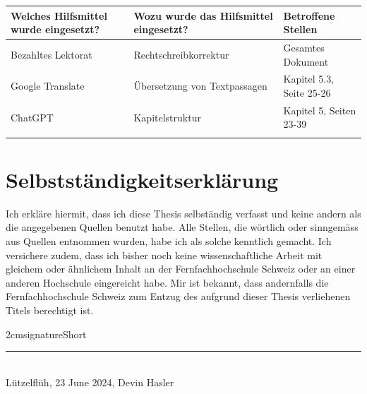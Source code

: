 \documentclass{ffhsthesis}
\begin{document}
    \begin{table}[h!]
        \centering
        \begin{tabular}{|p{5cm}|p{5cm}|p{4cm}|} \hline
        \textbf{Welches Hilfsmittel wurde eingesetzt?} & \textbf{Wozu wurde das Hilfsmittel eingesetzt?}  & \textbf{Betroffene Stellen}\\ \hline
        Bezahltes Lektorat & Rechtschreibkorrektur & Gesamtes Dokument \\ \hline
        Google Translate & Übersetzung von Textpassagen & Kapitel 5.3, Seite 25-26 \\ \hline
        ChatGPT & Kapitelstruktur & Kapitel 5, Seiten 23-39 \\ \hline
        &  & \\ \hline
        \end{tabular}
        \label{tab:hilfsmittelverzeichnis}
    \end{table}
    



    \chapter*{Selbstständigkeitserklärung}
    Ich erkläre hiermit, dass ich diese Thesis selbständig verfasst
    und keine andern als die angegebenen Quellen benutzt habe.
    Alle Stellen, die wörtlich oder sinngemäss aus Quellen entnommen wurden,
    habe ich als solche kenntlich gemacht.
    Ich versichere zudem, dass ich bisher
    noch keine wissenschaftliche Arbeit mit gleichem oder ähnlichem Inhalt an der
    Fernfachhochschule Schweiz oder an einer anderen Hochschule eingereicht habe.
    Mir ist bekannt, dass andernfalls die Fernfachhochschule Schweiz zum Entzug
    des aufgrund dieser Thesis verliehenen Titels berechtigt ist.
    \vspace{4cm}
    \noindent
    \signature{3cm}{2cm}{signatureShort}
    \hrule \ \\[-0.5ex]
    Lützelflüh, 23 June 2024, Devin Hasler
\end{document}
